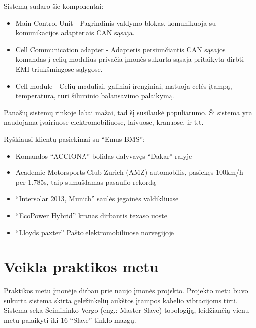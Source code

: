 \documentclass[12pt, a4paper, lithuanian, final]{article}
\begin{document}
Sistemą sudaro šie komponentai:
\begin{itemize}
	\item{Main Control Unit} - Pagrindinis valdymo blokas, komunikuoja su komunikacijos adapteriais CAN sąsaja.
	\item{Cell Communication adapter} - Adapteris persiunčiantis CAN sąsajos komandas į celių modulius privačia įmonės sukurta sąsaja pritaikyta dirbti EMI triukšmingose sąlygose.
	\item{Cell module} - Celių moduliai, galiniai įrenginiai, matuoja celės įtampą, temperatūra, turi šiluminio balansavimo palaikymą.
\end{itemize}

Panašių sistemų rinkoje labai mažai, tad šį susilaukė populiarumo.
Ši sistema yra naudojama įvairiuose elektromobiliuose, laivuose, kranuose. ir t.t.

Ryškiausi klientų pasiekimai su "`Emus BMS"':
\begin{itemize}
	\item Komandos "`ACCIONA"' bolidas dalyvavęs "`Dakar"' ralyje
	\item Academic Motorsports Club Zurich (AMZ) automobilis, pasiekęs 100km/h per 1.785s, taip sumušdamas pasaulio rekordą
	\item "`Intersolar 2013, Munich"' saulės jegainės valdikliuose
	\item "`EcoPower Hybrid"' kranas dirbantis texaso uoste
	\item "`Lloyds paxter"' Pašto elektromobiliuose norvegijoje
\end{itemize}











\section{Veikla praktikos metu}

Praktikos metu įmonėje dirbau prie naujo įmonės projekto.
Projekto metu buvo sukurta sistema skirta geležinkelių aukštos įtampos kabelio vibracijoms tirti.
Sistema seka Šeimininko-Vergo (eng.: Master-Slave) topologiją, leidžiančią vienu metu palaikyti iki 16 "`Slave"' tinklo mazgų.
\end{document}
